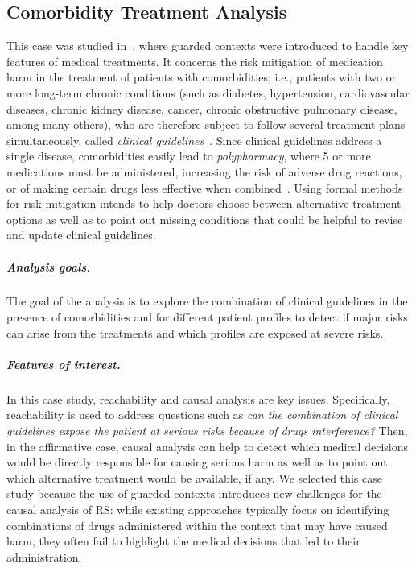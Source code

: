 
\subsection{Comorbidity Treatment Analysis}\label{sec:cmsb2024}

This case was studied in~\cite{DBLP:conf/cmsb/BowlesBBFGM24}, where guarded contexts were introduced to handle key features of medical treatments. It concerns the risk mitigation of medication harm in the treatment of patients with comorbidities; i.e., patients with two or more long-term chronic conditions (such as diabetes, hypertension, cardiovascular diseases, chronic kidney disease, cancer, chronic obstructive pulmonary disease, among many others), who are therefore subject to follow several treatment plans simultaneously, called \emph{clinical guidelines}~\cite{feder1999using,woolf1999potential}. Since clinical guidelines address a single disease, comorbidities easily lead to  \emph{polypharmacy}, where 5 or more medications must be administered, increasing the risk of adverse drug reactions, or of making certain drugs less effective when combined~\cite{Gut12}. Using formal methods for risk mitigation intends to help doctors choose between alternative treatment options as well as to point out missing conditions that could be helpful to revise and update clinical guidelines. 

\subparagraph*{Analysis goals.}
The goal of the analysis is to explore the combination of clinical guidelines in the presence of comorbidities and for different patient profiles to detect if major risks can arise from the treatments and which profiles are exposed at severe risks.

\subparagraph*{Features of interest.}
In this case study, reachability and causal analysis are key issues.
Specifically, reachability is used to address questions such as \emph{can the combination of clinical guidelines expose the patient at serious risks because of drugs interference?}
Then, in the affirmative case, causal analysis can help to detect which medical decisions would be directly responsible for causing serious harm as well as to point out  which alternative treatment would be available, if any.
We selected this case study because the use of guarded contexts introduces new challenges for the causal analysis of RS: while existing approaches typically focus on identifying combinations of drugs administered within the context that may have caused harm, they often fail to highlight the medical decisions that led to their administration.

